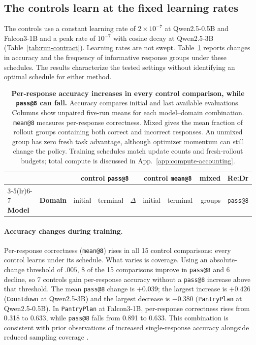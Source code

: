 \subsection{The controls learn at the fixed learning rates}
\label{app:control-learning-audit}

The controls use a constant learning rate of $2\times10^{-7}$ at
Qwen2.5-0.5B and Falcon3-1B and a peak rate of $10^{-7}$ with cosine decay
at Qwen2.5-3B (Table~\ref{tab:run-contract}). Learning rates are not swept.
Table~\ref{tab:control-learning-audit} reports changes in accuracy and the
frequency of informative response groups under these schedules. The
results characterize the tested settings without identifying an optimal
schedule for either method.

\begin{table}[t]
  \centering
  \caption{\textbf{Per-response accuracy increases in every control comparison,
  while \texttt{pass@8} can fall.} Accuracy compares initial and last
  available evaluations. Columns show unpaired five-run means for each
  model--domain combination. \texttt{mean@8} measures per-response
  correctness. Mixed gives the mean fraction of rollout groups
  containing both correct and incorrect responses. An unmixed group has
  zero fresh task advantage, although optimizer momentum can still change
  the policy. Training schedules match update counts and fresh-rollout
  budgets; total compute is discussed in App.~\ref{app:compute-accounting}.}
  \label{tab:control-learning-audit}
  \small
  \setlength{\tabcolsep}{5pt}
  \begin{tabular}{@{}llrrrrrrr@{}}
    \toprule
    & & \multicolumn{3}{c}{\textbf{control \texttt{pass@8}}}
      & \multicolumn{2}{c}{\textbf{control \texttt{mean@8}}}
      & \textbf{mixed} & \textbf{Re:Dr} \\
    \cmidrule(lr){3-5}\cmidrule(lr){6-7}
    \textbf{Model} & \textbf{Domain} & initial & terminal & $\Delta$
      & initial & terminal & groups & \texttt{pass@8} \\
    \midrule
    
  \end{tabular}
\end{table}

\paragraph{Accuracy changes during training.}
Per-response correctness (\texttt{mean@8}) rises in all 15
control comparisons: every control learns under its schedule. What varies
is coverage. Using an absolute-change threshold of $.005$, 8 of the
15 comparisons improve in \texttt{pass@8} and
6 decline, so 7 controls gain per-response accuracy
without a \texttt{pass@8} increase above that threshold. The mean
\texttt{pass@8} change is +0.039; the largest increase is $+0.426$
(\texttt{Countdown} at Qwen2.5-3B) and the largest decrease is $-0.380$
(\texttt{PantryPlan} at Qwen2.5-0.5B). In \texttt{PantryPlan} at Falcon3-1B, per-response correctness rises from
0.318 to 0.633, while \texttt{pass@8}
falls from 0.891 to 0.633.
This combination is consistent with prior observations of increased
single-response accuracy alongside reduced sampling coverage
\citep{yue2025rlvrlimit}.

